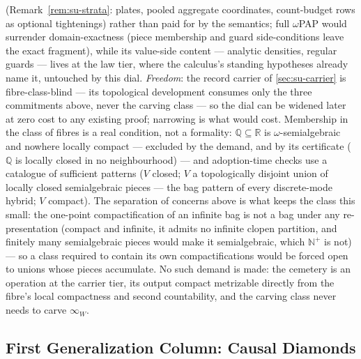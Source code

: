 (Remark~\ref{rem:su-strata}: plates, pooled aggregate coordinates,
count-budget rows as optional tightenings) rather than paid for by
the semantics; full
$\omega$PAP would surrender domain-exactness (piece membership and
guard side-conditions leave the exact fragment), while its
value-side content --- analytic densities, regular guards --- lives
at the law tier, where the calculus's standing hypotheses already
name it, untouched by this dial. \emph{Freedom}: the record carrier
of \autoref{sec:su-carrier} is fibre-class-blind --- its
topological development consumes only the three commitments above,
never the carving class --- so the dial can be widened later at zero
cost to any existing proof; narrowing is what would cost.
Membership in the class of fibres is a real condition, not a
formality: $\mathbb{Q} \subseteq \mathbb{R}$ is $\omega$-semialgebraic
and nowhere locally compact --- excluded by the demand, and by its
certificate ($\mathbb{Q}$ is locally closed in no neighbourhood) ---
and adoption-time checks use a catalogue of sufficient patterns
($V$ closed; $V$ a topologically disjoint union of locally closed
semialgebraic pieces --- the bag pattern of every discrete-mode
hybrid; $V$ compact). The separation of concerns above is what keeps
the class this small: the one-point compactification of an infinite
bag is not a bag under any re-presentation (compact and infinite, it
admits no infinite clopen partition, and finitely many semialgebraic
pieces would make it semialgebraic, which $\mathbb{N}^{+}$ is not)
--- so a class required to contain its own compactifications would
be forced open to unions whose pieces accumulate. No such demand is
made: the cemetery is an operation at the carrier tier, its output
compact metrizable directly from the fibre's local compactness and
second countability, and the carving class never needs to carve
$\infty_W$.

\subsection{First Generalization Column: Causal Diamonds}

